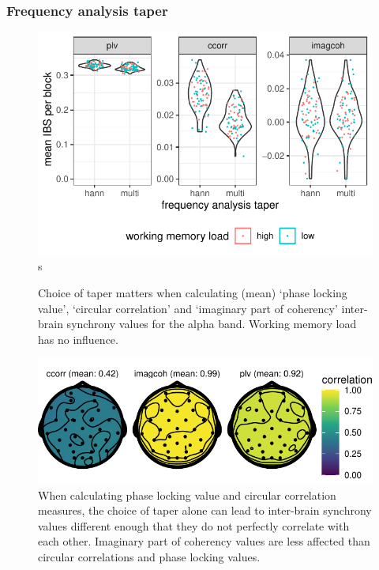 \subsubsection{Frequency analysis taper}

\begin{figure}[!htpb]
  \includegraphics[width=\linewidth]{../stats/results/freqmethod.pdf}s
  \caption{Choice of taper matters when calculating (mean) `phase locking value', `circular correlation' and `imaginary part of coherency' inter-brain synchrony values for the alpha band. Working memory load has no influence.}
  \label{fig:freqmethod}
\end{figure}

\begin{figure}[!htpb]
  \includegraphics[width=\linewidth]{../stats/results/freqmethodcorr.pdf}
  \caption{When calculating phase locking value and circular correlation measures, the choice of taper alone can lead to inter-brain synchrony values different enough that they do not perfectly correlate with each other. Imaginary part of coherency values are less affected than circular correlations and phase locking values.}
  \label{fig:freqmethodcorr}
\end{figure}

